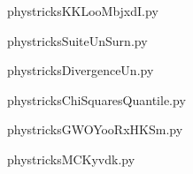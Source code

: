 
    \newcommand{\CaptionFigKKLooMbjxdI}{<+Type your caption here+>}
    \begin{center}
        
    \end{center}
    phystricksKKLooMbjxdI.py

    

    \clearpage
    


    \newcommand{\CaptionFigSuiteUnSurn}{<+Type your caption here+>}
    \begin{center}
        
    \end{center}
    phystricksSuiteUnSurn.py

    

    \clearpage
    


    \newcommand{\CaptionFigDivergenceUn}{<+Type your caption here+>}
    \begin{center}
        
    \end{center}
    phystricksDivergenceUn.py

    

    \clearpage
    


    \newcommand{\CaptionFigChiSquaresQuantile}{<+Type your caption here+>}
    \begin{center}
        
    \end{center}
    phystricksChiSquaresQuantile.py

    

    \clearpage
    


    \newcommand{\CaptionFigGWOYooRxHKSm}{<+Type your caption here+>}
    \begin{center}
        
    \end{center}
    phystricksGWOYooRxHKSm.py

    

    \clearpage
    


    \newcommand{\CaptionFigMCKyvdk}{<+Type your caption here+>}
    \begin{center}
        
    \end{center}
    phystricksMCKyvdk.py

